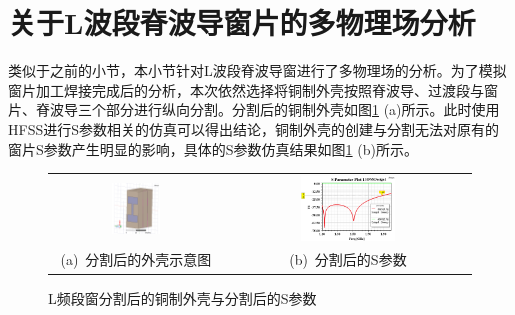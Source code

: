 \documentclass[master]{thesis-uestc}
\begin{document}
\section{关于L波段脊波导窗片的多物理场分析}
类似于之前的小节，本小节针对L波段脊波导窗进行了多物理场的分析。为了模拟窗片加工焊接完成后的分析，本次依然选择将铜制外壳按照脊波导、过渡段与窗片、脊波导三个部分进行纵向分割。分割后的铜制外壳如图\ref{fig:L分割后的铜制外壳} (a)所示。此时使用HFSS进行S参数相关的仿真可以得出结论，铜制外壳的创建与分割无法对原有的窗片S参数产生明显的影响，具体的S参数仿真结果如图\ref{fig:L分割后的铜制外壳} (b)所示。
\begin{figure}[!htb]
    \small
    \centering
    \begin{tabular}{@{\ }c@{\ }c}
        \includegraphics[width=0.3\textwidth]{pic/chapter4/L频段分割后的铜制外壳.png} & 
        \hspace{5pt}
        \includegraphics[width=0.4\textwidth]{pic/chapter4/L频段分割铜制外壳后的S曲线.png}     \\
        \mbox{\small (a) 分割后的外壳示意图}                                                                               & 
        \mbox{\small (b) 分割后的S参数}                                                                                  \\
    \end{tabular}
    \caption{L频段窗分割后的铜制外壳与分割后的S参数}
    \label{fig:L分割后的铜制外壳}
\end{figure}
\end{document}
